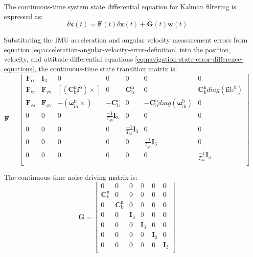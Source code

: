 \documentclass{article}
\begin{document}
The continuous-time system state differential equation for Kalman filtering is expressed as:
\begin{equation}
    \delta \dot{\boldsymbol{x}}({t}) = \boldsymbol{F}({t}) \delta \boldsymbol{x}({t}) + \boldsymbol{G}({t}) \boldsymbol{w}({t})
\end{equation}

Substituting the IMU acceleration and angular velocity measurement errors from equation \eqref{eq:acceleration-angular-velocity-error-definition} into the position, velocity, and attitude differential equations \eqref{eq:navigation-state-error-difference-equations}, the continuous-time state transition matrix is:
\begin{equation}
    \boldsymbol{F}=\left[ \begin{matrix}
        \boldsymbol{F}_{\mathrm{rr}}&		\boldsymbol{I}_3&		0&		0&		0&		0&		0\\
        \boldsymbol{F}_{\mathrm{vr}}&		\boldsymbol{F}_{\mathrm{vv}}&		[(\mathbf{C}_{\mathrm{b}}^{\mathrm{n}}\boldsymbol{f}^{\mathrm{b}})\times ]&		0&		\mathbf{C}_{\mathrm{b}}^{\mathrm{n}}&		0&		\mathbf{C}_{\mathrm{b}}^{\mathrm{n}}{diag}(\boldsymbol{f}{\mathrm{ib}}^{\mathrm{b}})\\
        \boldsymbol{F}_{\phi \mathrm{r}}&		\boldsymbol{F}_{\phi \mathrm{v}}&		-(\boldsymbol{\omega }_{\mathrm{in}}^{\mathrm{n}}\times )&		-\mathbf{C}_{\mathrm{b}}^{\mathrm{n}}&		0&		-\mathbf{C}_{\mathrm{b}}^{\mathrm{n}}{diag}(\boldsymbol{\omega }_{\mathrm{ib}}^{\mathrm{b}})&		0\\
        0&		0&		0&		\displaystyle{\frac{-1}{{T}_{gb}}\boldsymbol{I}_3}&		0&		0&		0\\
        0&		0&		0&		0&		\displaystyle{\frac{-1}{{T}_{{ab}}}\boldsymbol{I}_3}&		0&		0\\
        0&		0&		0&		0&		0&		\displaystyle{\frac{-1}{{T}_{{gs}}}\boldsymbol{I}_3}&		0\\
        0&		0&		0&		0&		0&		0&		\displaystyle{\frac{-1}{{T}_{{as}}}\boldsymbol{I}_3}\\
    \end{matrix} \right] 
\end{equation}

The continuous-time noise driving matrix is:
\begin{equation}
    {\boldsymbol{G}}=\left[ \begin{matrix}
        0&		0&		0&		0&		0&		0\\
        \mathbf{C}_{\mathrm{b}}^{\mathrm{n}}&		0&		0&		0&		0&		0\\
        0&		\mathbf{C}_{\mathrm{b}}^{\mathrm{n}}&		0&		0&		0&		0\\
        0&		0&		\boldsymbol{I}_3&		0&		0&		0\\
        0&		0&		0&		\boldsymbol{I}_3&		0&		0\\
        0&		0&		0&		0&		\boldsymbol{I}_3&		0\\
        0&		0&		0&		0&		0&		\boldsymbol{I}_3\\
    \end{matrix} \right] 
\end{equation}
\end{document}
